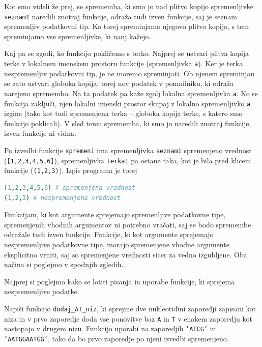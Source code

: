 \begin{resitev}
Kot smo videli že prej, se sprememba, ki smo jo nad plitvo kopijo spremenljivke \texttt{seznam1} naredili znotraj funkcije, odraža tudi izven funkcije, saj je seznam spremenljiv podatkovni tip. Ko torej spreminjamo njegovo plitvo kopijo, s tem spreminjamo vse spremenljivke, ki nanj kažejo. 

Kaj pa se zgodi, ko funkcijo pokličemo s terko. Najprej se ustvari plitva kopija terke v lokalnem imenskem prostoru funkcije (spremenljivka \texttt{a}). Ker je terka nespremenljiv podatkovni tip, je ne moremo spreminjati. Ob njenem spreminjau se zato ustvari globoka kopija, torej nov podatek v pomnilniku, ki odraža narejeno spremembo. Na ta podatek pa kaže zgolj lokalna spremenljivka \texttt{a}. Ko se funkcija zaključi, njen lokalni imenski prostor skupaj z lokalno spremenljivko \texttt{a} izgine (tako kot tudi spremenjena terka -- globoka kopija terke, s katero smo funkcijo poklicali). V sled temu sprememba, ki smo jo naredili znotraj funkcije, izven funkcije ni vidna.

Po izvedbi funkcije \texttt{spremeni} ima spremenljivka \texttt{seznam1} spremenjeno vrednost (\texttt{[1,2,3,4,5,6]}), spremenljivka \texttt{terka1} pa ostane taka, kot je bila pred klicem funkcije (\texttt{(1,2,3)}). Izpis programa je torej
\begin{lstlisting}[language=Python, showstringspaces=false]
[1,2,3,4,5,6] # spremenjena vrednost
(1,2,3) # nespremenjena vrednost
\end{lstlisting}

\end{resitev}

Funkcijam, ki kot argumente sprejemajo spremenljive podatkovne tipe, spremenjenih vhodnih argumentov ni potrebno vračati, saj se bodo spremembe odražale tudi izven funkcije. Funkcije, ki kot argumente sprejemajo nespremenljive podatkovne tipe, morajo spremenjene vhodne argumente eksplicitno vrniti, saj so spremenjene vrednosti sicer za vedno izgubljene. Oba načina si poglejmo v spodnjih zgledih.

Najprej si poglejmo kako se lotiti pisanja in uporabe funkcije, ki sprejema nespremenljive podatke.
\begin{zgled}
Napiši funkcijo \texttt{dodaj\_AT\_niz}, ki sprejme dve nukleotidini zaporedji zapisani kot niza in v prvo zaporedje doda vse ponovitve baz \texttt{A} in \texttt{T} v enakem zaporedju kot nastopajo v drugem nizu. Funkcijo uporabi na zaporedjih \texttt{'ATCG'} in \texttt{'AATGGAATGG'}, tako da bo prvo zaporedje po njeni izvedbi spremenjeno.
\end{zgled}

